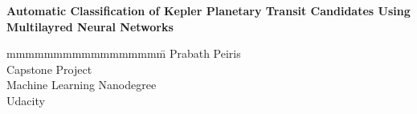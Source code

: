 \documentclass[a4paper,12pt]{report}
\begin{document}
\doublespacing

\begin{titlepage}
\vspace*{2cm}
\noindent
\begin{flushleft}
	\setlength{\baselineskip}{2\baselineskip}
	{{\Huge \bf Automatic Classification of Kepler Planetary Transit Candidates Using Multilayred Neural Networks}}
\end{flushleft}


\vspace{1cm}
\vspace{\fill}
\vspace{1.3cm}
\begin{tabbing}
mmmmmmmmmmmmmmmmm\= \kill
\>Prabath Peiris\\
\>Capstone Project\\
\>Machine Learning Nanodegree\\
\>Udacity\\
\> \\
\end{tabbing}
\end{titlepage}

\thispagestyle{empty}
\newlength{\origpar}
\setlength{\origpar}{\parindent}
\setlength{\parindent}{0pt}
%
\setlength{\parindent}{\origpar}
\thispagestyle{empty}
\tableofcontents
\clearpage

\renewcommand {\baselinestretch} {1.0}
\pagebreak








%
%
%
%
%
%


\end{document}
